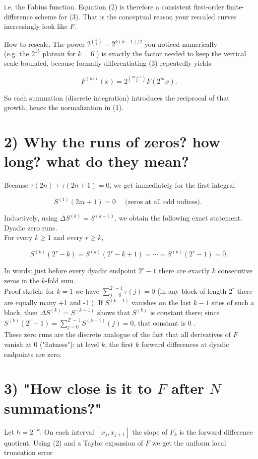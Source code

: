 \documentclass[10pt]{article}
\begin{document}
i.e. the Fabius function. Equation (2) is therefore a consistent first-order finite-difference scheme for (3). That is the conceptual reason your rescaled curves increasingly look like $F$.

How to rescale. The power $2^{\binom{k}{2}}=2^{k(k-1) / 2}$ you noticed numerically\\
(e.g. the $2^{15}$ plateau for $k=6$ ) is exactly the factor needed to keep the vertical scale bounded, because formally differentiating (3) repeatedly yields

$$
F^{(m)}(x)=2^{\binom{m+1}{2}} F\left(2^{m} x\right) .
$$

So each summation (discrete integration) introduces the reciprocal of that growth, hence the normalization in (1).

\section*{2) Why the runs of zeros? how long? what do they mean?}
Because $\tau(2 n)+\tau(2 n+1)=0$, we get immediately for the first integral

$$
S^{(1)}(2 m+1)=0 \quad \text { (zeros at all odd indices). }
$$

Inductively, using $\Delta S^{(k)}=S^{(k-1)}$, we obtain the following exact statement.\\
Dyadic zero runs.\\
For every $k \geq 1$ and every $r \geq k$,

$$
S^{(k)}\left(2^{r}-k\right)=S^{(k)}\left(2^{r}-k+1\right)=\cdots=S^{(k)}\left(2^{r}-1\right)=0 .
$$

In words: just before every dyadic endpoint $2^{r}-1$ there are exactly $k$ consecutive zeros in the $k$-fold sum.\\
Proof sketch: for $k=1$ we have $\sum_{j=0}^{2^{r}-1} \tau(j)=0$ (in any block of length $2^{r}$ there are equally many +1 and -1 ). If $S^{(k-1)}$ vanishes on the last $k-1$ sites of such a block, then $\Delta S^{(k)}=S^{(k-1)}$ shows that $S^{(k)}$ is constant there; since $S^{(k)}\left(2^{r}-1\right)=\sum_{j=0}^{2^{r}-1} S^{(k-1)}(j)=0$, that constant is 0 .\\
These zero runs are the discrete analogue of the fact that all derivatives of $F$ vanish at 0 ("flatness"): at level $k$, the first $k$ forward differences at dyadic endpoints are zero.

\section*{3) "How close is it to $F$ after $N$ summations?"}
Let $h=2^{-k}$. On each interval $\left[x_{j}, x_{j+1}\right]$ the slope of $F_{k}$ is the forward difference quotient. Using (2) and a Taylor expansion of $F$ we get the uniform local truncation error
\end{document}
